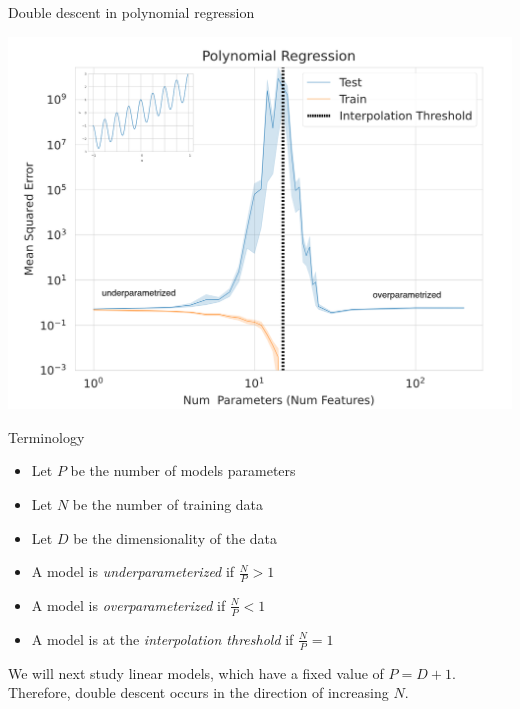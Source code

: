 \documentclass{beamer}
\begin{document}
\begin{frame}{Double descent in polynomial regression}
\begin{center}
\includegraphics[scale=0.22]{polyreg.png}
\end{center}
\end{frame}


\begin{frame}{Terminology}
    \begin{itemize}
        \item Let $P$ be the number of models parameters
        \item Let $N$ be the number of training data
        \item Let $D$ be the dimensionality of the data
    \end{itemize}
    
    \pause
    
    \begin{itemize}
        \item A model is \emph{underparameterized} if $\frac{N}{P} > 1$
        \item A model is \emph{overparameterized} if $\frac{N}{P} < 1$
        \item A model is at the \emph{interpolation threshold} if $\frac{N}{P} = 1$
    \end{itemize}
    
    \pause
    \hspace{5cm}

    We will next study linear models, which have a fixed value of $P=D+1$. Therefore, double descent occurs in the direction of increasing $N$.

\end{frame}
\end{document}
